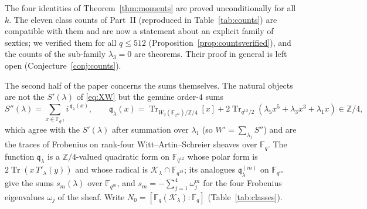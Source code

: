 ﻿\documentclass[12pt,a4paper]{amsart}
\theoremstyle{definition}
\newcommand{\F}{\mathbb{F}}
\newcommand{\Z}{\mathbb{Z}}
\newcommand{\Tr}{\operatorname{Tr}}
\newcommand{\Kk}{\mathcal{K}}
\newcommand{\qq}{\mathfrak{q}}
\newcommand{\Spp}{S''}
\begin{document}
The four identities of Theorem~\ref{thm:moments} are proved unconditionally for all $k$. The eleven class counts of Part~II (reproduced in Table~\ref{tab:counts}) are compatible with them and are now a statement about an explicit family of sextics; we verified them for all $q\le512$ (Proposition~\ref{prop:countsverified}), and the counts of the sub-family $\lambda_3=0$ are theorems. Their proof in general is left open (Conjecture~\ref{conj:counts}).

The second half of the paper concerns the sums themselves. The natural objects are not the $S'(\lambda)$ of \eqref{eq:XW} but the genuine order-$4$ sums
\begin{equation}\label{eq:Spp}
\Spp(\lambda)=\sum_{x\in\F_{q^{12}}}i^{\,\qq_\lambda(x)},\qquad \qq_\lambda(x)=\Tr_{W_2(\F_{q^{12}})/\Z/4}[x]+2\Tr_{q^{12}/2}(\lambda_5x^5+\lambda_3x^3+\lambda_1x)\in\Z/4,
\end{equation}
which agree with the $S'(\lambda)$ after summation over $\lambda_1$ (so $W'=\sum_{\lambda_1}\Spp$) and are the traces of Frobenius on rank-four Witt--Artin--Schreier sheaves over $\F_q$. The function $\qq_\lambda$ is a $\Z/4$-valued quadratic form on $\F_{q^{12}}$ whose polar form is $2\Tr(x\,T'_\lambda(y))$ and whose radical is $\Kk_\lambda\cap\F_{q^{12}}$; its analogues $\qq^{(m)}_\lambda$ on $\F_{q^m}$ give the sums $s_m(\lambda)$ over $\F_{q^m}$, and $s_m=-\sum_{j=1}^4\omega_j^m$ for the four Frobenius eigenvalues $\omega_j$ of the sheaf. Write $N_0=[\F_q(\Kk_\lambda):\F_q]$ (Table~\ref{tab:classes}).
\end{document}
